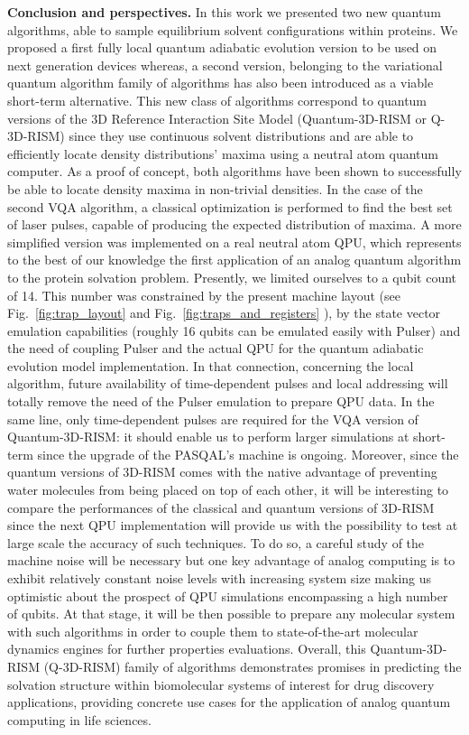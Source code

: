 \documentclass[fleqn,10pt]{wlscirep}
\begin{document}
\textbf{Conclusion and perspectives.} In this work we presented two new quantum algorithms, able to sample equilibrium solvent configurations within proteins. 
We proposed a first fully local quantum adiabatic evolution version to be used on next generation devices whereas, a second version, belonging to the variational quantum algorithm family of algorithms has also been introduced as a viable short-term alternative.  
This new class of algorithms correspond to quantum versions of the 3D Reference Interaction Site Model (Quantum-3D-RISM or Q-3D-RISM) since they use continuous solvent distributions and are able to efficiently locate density distributions' maxima using a neutral atom quantum computer. As a proof of concept, both algorithms have been shown to successfully be able to locate density maxima in non-trivial densities. In the case of the second VQA algorithm, a classical optimization is performed to find the best set of laser pulses, capable of producing the expected distribution of maxima. A more simplified version was implemented on a real neutral atom QPU, which represents to the best of our knowledge the first application of an analog quantum algorithm to the protein solvation problem.
Presently, we limited ourselves to a qubit count of 14. This number was constrained by the present machine layout (see Fig.~\ref{fig:trap_layout} and Fig.~\ref{fig:traps_and_registers} ), by the state vector emulation capabilities (roughly 16 qubits can be emulated easily with Pulser) and the need of coupling Pulser and the actual QPU for the quantum adiabatic evolution model implementation. In that connection, concerning the local algorithm, future availability of time-dependent pulses and local addressing will totally remove the need of the Pulser emulation to prepare QPU data. In the same line, only time-dependent pulses are required for the VQA version of Quantum-3D-RISM: it should enable us to perform larger simulations at short-term since the upgrade of the PASQAL's machine is ongoing. Moreover, since the quantum versions of 3D-RISM comes with the native advantage of preventing water molecules from being placed on top of each other, it will be  interesting to compare the performances of the classical and quantum versions of 3D-RISM since the next QPU implementation will provide us with the possibility to test at large scale the accuracy of such techniques. To do so, a careful study of the machine noise will be necessary but one key advantage of analog computing is to exhibit relatively constant noise levels with increasing system size making us optimistic about the prospect of QPU simulations encompassing a high number of qubits. At that stage, it will be then possible to prepare any molecular system with such algorithms in order to couple them to state-of-the-art molecular dynamics engines\cite{THP,THP-GPU} for further properties evaluations.  Overall, this Quantum-3D-RISM (Q-3D-RISM) family of algorithms demonstrates promises in predicting the solvation structure within biomolecular systems of interest for drug discovery applications, providing concrete use cases for the application of analog quantum computing in life sciences.
\end{document}

